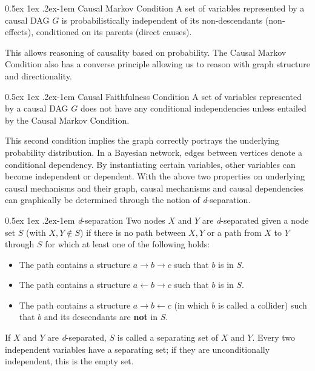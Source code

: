 \documentclass[a4paper, 10pt, english, onecolumn]{article}
\makeatletter
\renewcommand{\paragraph}{%
  \@startsection{paragraph}{4}%
  {\z@}{0.5ex \@plus 1ex \@minus .2ex}{-1em}%
  {\normalfont\normalsize\bfseries}%
}
\makeatother
\begin{document}
\paragraph{Causal Markov Condition}
A set of variables represented by a causal DAG $G$ is probabilistically independent of its non-descendants (non-effects), conditioned on its parents (direct causes).

This allows reasoning of causality based on probability.
The Causal Markov Condition also has a converse principle allowing us to reason with graph structure and directionality.

\paragraph{Causal Faithfulness Condition}
A set of variables represented by a causal DAG $G$ does not have any conditional independencies unless entailed by the Causal Markov Condition.

This second condition implies the graph correctly portrays the underlying probability distribution.
In a Bayesian network, edges between vertices denote a conditional dependency.
By instantiating certain variables, other variables can become independent or dependent.
With the above two properties on underlying causal mechanisms and their graph, causal mechanisms and causal dependencies can graphically be determined through the notion of \textit{d}-separation.

\paragraph{\textit{d}-separation}
Two nodes $X$ and $Y$ are \textit{d}-separated given a node set $S$ (with $X, Y \notin S$) if there is no path between $X,Y$ or a path from $X$ to $Y$ through $S$ for which at least one of the following holds:
\begin{itemize}
\item The path contains a structure $a \rightarrow b \rightarrow c$ such that $b$ is in $S$.
\item The path contains a structure $a \leftarrow b \rightarrow c$ such that $b$ is in $S$.
\item The path contains a structure $a \rightarrow b \leftarrow c$ (in which $b$ is called a collider) such that $b$ and its descendants are \textbf{not} in $S$.
\end{itemize}
If $X$ and $Y$ are \textit{d}-separated, $S$ is called a separating set of $X$ and $Y$.
Every two independent variables have a separating set; if they are unconditionally independent, this is the empty set.
\end{document}
